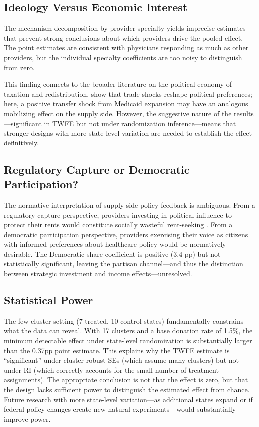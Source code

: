 \documentclass[12pt]{article}
\begin{document}
\subsection{Ideology Versus Economic Interest}

The mechanism decomposition by provider specialty yields imprecise estimates that prevent strong conclusions about which providers drive the pooled effect. The point estimates are consistent with physicians responding as much as other providers, but the individual specialty coefficients are too noisy to distinguish from zero.

This finding connects to the broader literature on the political economy of taxation and redistribution. \citet{autor2024populism} show that trade shocks reshape political preferences; here, a positive transfer shock from Medicaid expansion may have an analogous mobilizing effect on the supply side. However, the suggestive nature of the results---significant in TWFE but not under randomization inference---means that stronger designs with more state-level variation are needed to establish the effect definitively.

\subsection{Regulatory Capture or Democratic Participation?}

The normative interpretation of supply-side policy feedback is ambiguous. From a \citet{stigler1971theory} regulatory capture perspective, providers investing in political influence to protect their rents would constitute socially wasteful rent-seeking \citep{tullock1967welfare}. From a democratic participation perspective, providers exercising their voice as citizens with informed preferences about healthcare policy would be normatively desirable. The Democratic share coefficient is positive (3.4 pp) but not statistically significant, leaving the partisan channel---and thus the distinction between strategic investment and income effects---unresolved.

\subsection{Statistical Power}

The few-cluster setting (7 treated, 10 control states) fundamentally constrains what the data can reveal. With 17 clusters and a base donation rate of 1.5\%, the minimum detectable effect under state-level randomization is substantially larger than the 0.37pp point estimate. This explains why the TWFE estimate is ``significant'' under cluster-robust SEs (which assume many clusters) but not under RI (which correctly accounts for the small number of treatment assignments). The appropriate conclusion is not that the effect is zero, but that the design lacks sufficient power to distinguish the estimated effect from chance. Future research with more state-level variation---as additional states expand or if federal policy changes create new natural experiments---would substantially improve power.
\end{document}
